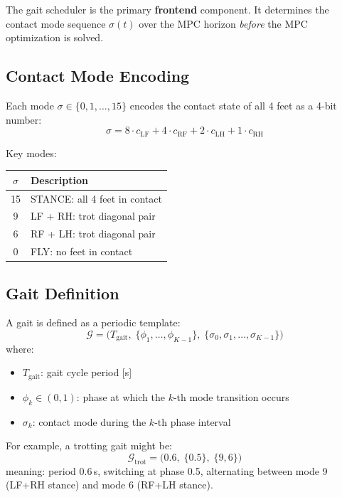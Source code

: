 \documentclass[11pt,a4paper]{article}
\begin{document}
The gait scheduler is the primary \textbf{frontend} component. It determines the contact mode sequence $\sigma(t)$ over the MPC horizon \emph{before} the MPC optimization is solved.

\subsection{Contact Mode Encoding}

Each mode $\sigma \in \{0, 1, \ldots, 15\}$ encodes the contact state of all 4 feet as a 4-bit number:
\begin{equation}
	\sigma = 8 \cdot c_{\text{LF}} + 4 \cdot c_{\text{RF}} + 2 \cdot c_{\text{LH}} + 1 \cdot c_{\text{RH}}
\end{equation}

Key modes:
\begin{center}
	\begin{tabular}{cl}
		\toprule
		$\sigma$ & Description                   \\
		\midrule
		15       & STANCE: all 4 feet in contact \\
		9        & LF + RH: trot diagonal pair   \\
		6        & RF + LH: trot diagonal pair   \\
		0        & FLY: no feet in contact       \\
		\bottomrule
	\end{tabular}
\end{center}

\subsection{Gait Definition}

A gait is defined as a periodic template:
\begin{equation}
	\mathcal{G} = \big( T_{\text{gait}},\; \{\phi_1, \ldots, \phi_{K-1}\},\; \{\sigma_0, \sigma_1, \ldots, \sigma_{K-1}\} \big)
\end{equation}
where:
\begin{itemize}
	\item $T_{\text{gait}}$: gait cycle period [s]
	\item $\phi_k \in (0, 1)$: phase at which the $k$-th mode transition occurs
	\item $\sigma_k$: contact mode during the $k$-th phase interval
\end{itemize}

For example, a trotting gait might be:
\begin{equation*}
	\mathcal{G}_{\text{trot}} = \big(0.6,\; \{0.5\},\; \{9, 6\}\big)
\end{equation*}
meaning: period 0.6\,s, switching at phase 0.5, alternating between mode 9 (LF+RH stance) and mode 6 (RF+LH stance).
\end{document}
